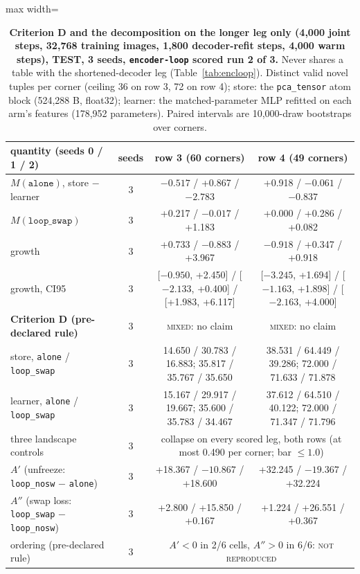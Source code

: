 \documentclass{article} %
\begin{document}
\begin{table}[h]
\centering\small
\caption{\textbf{Criterion D and the decomposition on the longer leg only (4,000 joint steps, %
32,768 training images, 1,800 decoder-refit steps, 4,000 warm steps), TEST, 3 seeds, %
\texttt{encoder-loop} scored run 2 of 3.} Never shares a table with the shortened-decoder leg
(Table~\ref{tab:encloop}). Distinct valid novel tuples per corner (ceiling 36 on row 3, 72 on
row 4); store: the \texttt{pca\_tensor} atom block (524,288 B, float32); learner: the %
matched-parameter MLP refitted on each arm's features (178,952 parameters). Paired intervals are %
10,000-draw bootstraps over corners.} %
\label{tab:bard-gpu}
\setlength{\tabcolsep}{2.4pt}
\begin{adjustbox}{max width=\linewidth}\begin{tabular}{lccc}
\toprule
quantity (seeds 0 / 1 / 2) & seeds & row 3 (60 corners) & row 4 (49 corners) \\ %
\midrule
$M(\texttt{alone})$, store $-$ learner & 3 & $-0.517$ / +0.867 / $-2.783$ & +0.918 / $-0.061$ / $-0.837$ \\
$M(\texttt{loop\_swap})$ & 3 & +0.217 / $-0.017$ / +1.183 & +0.000 / +0.286 / +0.082 \\
growth & 3 & +0.733 / $-0.883$ / +3.967 & $-0.918$ / +0.347 / +0.918 \\
growth, CI95 & 3 & [$-0.950$, +2.450] / [$-2.133$, +0.400] / [+1.983, +6.117] & [$-3.245$, +1.694] / [$-1.163$, +1.898] / [$-2.163$, +4.000] \\
\textbf{Criterion D (pre-declared rule)} & 3 & \textsc{mixed}: no claim & \textsc{mixed}: no claim \\
store, \texttt{alone} / \texttt{loop\_swap} & 3 & 14.650 / 30.783 / 16.883; 35.817 / 35.767 / 35.650 & 38.531 / 64.449 / 39.286; 72.000 / 71.633 / 71.878 \\
learner, \texttt{alone} / \texttt{loop\_swap} & 3 & 15.167 / 29.917 / 19.667; 35.600 / 35.783 / 34.467 & 37.612 / 64.510 / 40.122; 72.000 / 71.347 / 71.796 \\
three landscape controls & 3 & \multicolumn{2}{c}{collapse on every scored leg, both rows (at most 0.490 per corner; bar $\le1.0$)} \\
\midrule
$A'$ (unfreeze: \texttt{loop\_nosw} $-$ \texttt{alone}) & 3 & +18.367 / $-10.867$ / +18.600 & +32.245 / $-19.367$ / +32.224 \\
$A''$ (swap loss: \texttt{loop\_swap} $-$ \texttt{loop\_nosw}) & 3 & +2.800 / +15.850 / +0.167 & +1.224 / +26.551 / +0.367 \\
ordering (pre-declared rule) & 3 & \multicolumn{2}{c}{$A'<0$ in 2/6 cells, $A''>0$ in 6/6: \textsc{not reproduced}} \\
\bottomrule
\end{tabular}\end{adjustbox}
\end{table}
\end{document}
